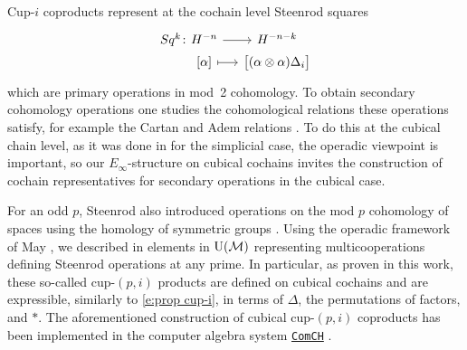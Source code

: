 Cup-$i$ coproducts represent at the cochain level Steenrod squares
\[
\begin{tikzcd} [column sep=small, row sep=0]
	Sq^k \colon &[-20] H^{-n} \arrow[r] & H^{-n-k} \\ &
	{[\alpha]} \arrow[r, mapsto] & \big[ (\alpha \ot \alpha) \Delta_i \big]
\end{tikzcd}
\]
which are primary operations in mod~2 cohomology.
To obtain secondary cohomology operations one studies the cohomological relations these operations satisfy, for example the Cartan and Adem relations \cite{steenrod1962cohomology}.
To do this at the cubical chain level, as it was done in \cite{medina2020cartan,medina2021adem} for the simplicial case, the operadic viewpoint is important, so our $E_\infty$-structure on cubical cochains invites the construction of cochain representatives for secondary operations in the cubical case.

For an odd $p$, Steenrod also introduced operations on the mod $p$ cohomology of spaces using the homology of symmetric groups \cite{steenrod1952reduced, steenrod1953cyclic}.
Using the operadic framework of May \cite{may1970general}, we described in \cite{medina2021may_st} elements in ${\operatorname{U}(\mathcal{M})}$ representing multicooperations defining Steenrod operations at any prime.
In particular, as proven in this work, these so-called cup-$(p,i)$ products are defined on cubical cochains and are expressible, similarly to \cref{e:prop cup-i}, in terms of $\Delta$, the permutations of factors, and $\ast$.
The aforementioned construction of cubical cup-$(p,i)$ coproducts has been implemented in the computer algebra system \href{https://comch.readthedocs.io/en/latest/}{\texttt{ComCH}} \cite{medina2021comch}.
